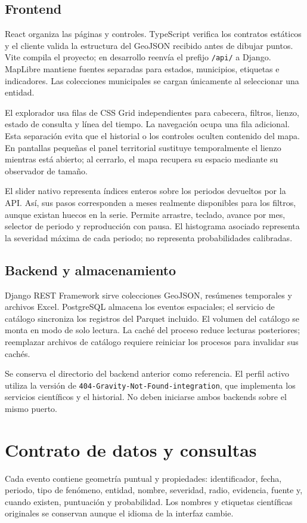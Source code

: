 \documentclass[11pt,a4paper]{article}
\begin{document}
\subsection{Frontend}
React organiza las páginas y controles. TypeScript verifica los contratos estáticos y el cliente valida la estructura del GeoJSON recibido antes de dibujar puntos. Vite compila el proyecto; en desarrollo reenvía el prefijo \texttt{/api/} a Django. MapLibre mantiene fuentes separadas para estados, municipios, etiquetas e indicadores. Las colecciones municipales se cargan únicamente al seleccionar una entidad.

El explorador usa filas de CSS Grid independientes para cabecera, filtros, lienzo, estado de consulta y línea del tiempo. La navegación ocupa una fila adicional. Esta separación evita que el historial o los controles oculten contenido del mapa. En pantallas pequeñas el panel territorial sustituye temporalmente el lienzo mientras está abierto; al cerrarlo, el mapa recupera su espacio mediante su observador de tamaño.

El slider nativo representa índices enteros sobre los periodos devueltos por la API. Así, sus pasos corresponden a meses realmente disponibles para los filtros, aunque existan huecos en la serie. Permite arrastre, teclado, avance por mes, selector de periodo y reproducción con pausa. El histograma asociado representa la severidad máxima de cada periodo; no representa probabilidades calibradas.

\subsection{Backend y almacenamiento}
Django REST Framework sirve colecciones GeoJSON, resúmenes temporales y archivos Excel. PostgreSQL almacena los eventos espaciales; el servicio de catálogo sincroniza los registros del Parquet incluido. El volumen del catálogo se monta en modo de solo lectura. La caché del proceso reduce lecturas posteriores; reemplazar archivos de catálogo requiere reiniciar los procesos para invalidar sus cachés.

Se conserva el directorio del backend anterior como referencia. El perfil activo utiliza la versión de \texttt{404-Gravity-Not-Found-integration}, que implementa los servicios científicos y el historial. No deben iniciarse ambos backends sobre el mismo puerto.

\section{Contrato de datos y consultas}
Cada evento contiene geometría puntual y propiedades: identificador, fecha, periodo, tipo de fenómeno, entidad, nombre, severidad, radio, evidencia, fuente y, cuando existen, puntuación y probabilidad. Los nombres y etiquetas científicas originales se conservan aunque el idioma de la interfaz cambie.
\end{document}
